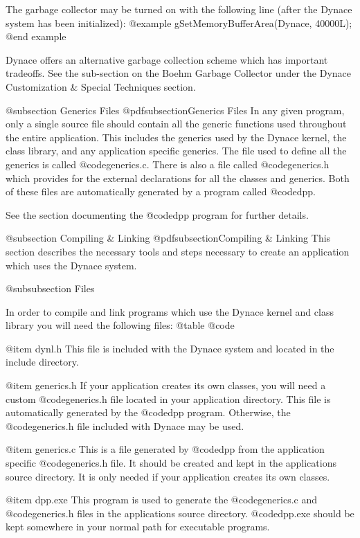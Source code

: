 The garbage collector may be turned on with the following line (after
the Dynace system has been initialized):
@example
        gSetMemoryBufferArea(Dynace, 40000L);
@end example

Dynace offers an alternative garbage collection scheme which has important
tradeoffs.  See the sub-section on the Boehm Garbage Collector under the
Dynace Customization & Special Techniques section.

@subsection Generics Files
@pdfsubsection{Generics Files}
In any given program, only a single source file should contain all the
generic functions used throughout the entire application.  This includes
the generics used by the Dynace kernel, the class library, and any
application specific generics.  The file used to define all the generics
is called @code{generics.c}.  There is also a file called @code{generics.h}
which provides for the external declarations for all the classes and
generics.  Both of these files are automatically generated by a program
called @code{dpp}.

See the section documenting the @code{dpp} program for further
details.


@subsection Compiling & Linking
@pdfsubsection{Compiling & Linking}
This section describes the necessary tools and steps necessary to create
an application which uses the Dynace system.

@subsubsection Files

In order to compile and link programs which use the Dynace kernel and class
library you will need the following files:
@table @code

@item dynl.h
This file is included with the Dynace system and located in the
include directory.

@item generics.h
If your application creates its own classes, you will need a custom
@code{generics.h} file located in your application directory.
This file is automatically generated by the @code{dpp} program.
Otherwise, the @code{generics.h} file included with Dynace may
be used.

@item generics.c
This is a file generated by @code{dpp} from the application specific
@code{generics.h} file.  It should be created and kept in the
applications source directory.  It is only needed if your application
creates its own classes.

@item dpp.exe
This program is used to generate the @code{generics.c} and
@code{generics.h} files in the applications source directory.
@code{dpp.exe} should be kept somewhere in your normal path for
executable programs.

